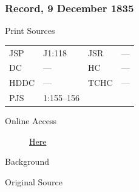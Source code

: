 		\subsubsection{Record, 9 December 1835}
			\label{EMS-1835-JS-9-DEC-1835}
			
			\begin{description}
				\item[Print Sources]
			\end{description}

				\begin{tabular}{p{0.5in}p{1in}p{0.5in}p{1in}}
				JSP	 	& J1:118		& JSR 		& --- \\
				DC	 	& --- 				& HC 		& --- \\
				HDDC 	& ---				& TCHC 		& --- \\
				PJS 	& 1:155--156			& 	 		&  \\
				\end{tabular}
			
			\begin{description}
				\item[Online Access] \href{https://www.josephsmithpapers.org/paper-summary/journal-1835-1836/60}{Here}
			\end{description}
			
			\begin{description}
				\item[Background]
			\end{description}
			
			
			\begin{description}
				\item[Original Source]
			\end{description}
			
			
